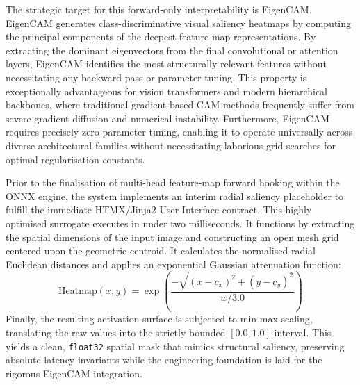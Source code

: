 The strategic target for this forward-only interpretability is EigenCAM. EigenCAM generates class-discriminative visual saliency heatmaps by computing the principal components of the deepest feature map representations. By extracting the dominant eigenvectors from the final convolutional or attention layers, EigenCAM identifies the most structurally relevant features without necessitating any backward pass or parameter tuning. This property is exceptionally advantageous for vision transformers and modern hierarchical backbones, where traditional gradient-based CAM methods frequently suffer from severe gradient diffusion and numerical instability. Furthermore, EigenCAM requires precisely zero parameter tuning, enabling it to operate universally across diverse architectural families without necessitating laborious grid searches for optimal regularisation constants.

Prior to the finalisation of multi-head feature-map forward hooking within the ONNX engine, the system implements an interim radial saliency placeholder to fulfill the immediate HTMX/Jinja2 User Interface contract. This highly optimised surrogate executes in under two milliseconds. It functions by extracting the spatial dimensions of the input image and constructing an open mesh grid centered upon the geometric centroid. It calculates the normalised radial Euclidean distances and applies an exponential Gaussian attenuation function:
\begin{equation}
    \text{Heatmap}(x, y) = \exp\left( \frac{-\sqrt{(x - c_x)^2 + (y - c_y)^2}}{w / 3.0} \right)
\end{equation}
Finally, the resulting activation surface is subjected to min-max scaling, translating the raw values into the strictly bounded $[0.0, 1.0]$ interval. This yields a clean, \texttt{float32} spatial mask that mimics structural saliency, preserving absolute latency invariants while the engineering foundation is laid for the rigorous EigenCAM integration.
